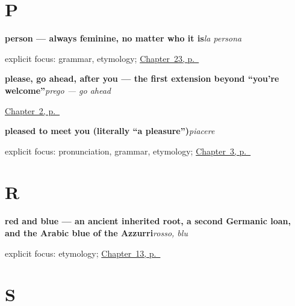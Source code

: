 \section*{P}

\noindent\begin{minipage}[t]{\linewidth}
\raggedright
\textbf{person — always feminine, no matter who it is}\enspace\emph{la persona}\par
\footnotesize explicit focus: grammar, etymology; \hyperref[ch:it-friends-family-name]{Chapter~23, p.~\pageref*{ch:it-friends-family-name}}
\end{minipage}\par\smallskip

\noindent\begin{minipage}[t]{\linewidth}
\raggedright
\textbf{please, go ahead, after you — the first extension beyond \textquotedblleft{}you're welcome\textquotedblright{}}\enspace\emph{prego — go ahead}\par
\footnotesize \hyperref[ch:it-how-are-you]{Chapter~2, p.~\pageref*{ch:it-how-are-you}}
\end{minipage}\par\smallskip

\noindent\begin{minipage}[t]{\linewidth}
\raggedright
\textbf{pleased to meet you (literally \textquotedblleft{}a pleasure\textquotedblright{})}\enspace\emph{piacere}\par
\footnotesize explicit focus: pronunciation, grammar, etymology; \hyperref[ch:it-introductions]{Chapter~3, p.~\pageref*{ch:it-introductions}}
\end{minipage}\par\smallskip

\section*{R}

\noindent\begin{minipage}[t]{\linewidth}
\raggedright
\textbf{red and blue — an ancient inherited root, a second Germanic loan, and the Arabic blue of the Azzurri}\enspace\emph{rosso, blu}\par
\footnotesize explicit focus: etymology; \hyperref[ch:it-colours]{Chapter~13, p.~\pageref*{ch:it-colours}}
\end{minipage}\par\smallskip

\section*{S}


